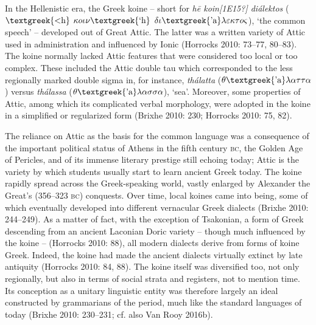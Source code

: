 \documentclass[12pt]{article}
\newenvironment{styleStandard}{\renewcommand\baselinestretch{1.25}\setlength\leftskip{0in}\setlength\rightskip{0in}\setlength\parindent{0.1972in}\setlength\parfillskip{0pt plus 1fil}\setlength\parskip{0in plus 1pt}\writerlistparindent\writerlistleftskip\leavevmode\normalfont\normalsize\writerlistlabel\ignorespaces}{\unskip\vspace{0in plus 1pt}\par}
\newcommand\writerlistleftskip{}
\newcommand\writerlistparindent{}
\newcommand\writerlistlabel{}
\begin{document}
\begin{styleStandard}
In the Hellenistic era, the Greek koine – short for \textit{h\=e koin[1E15?] diálektos} ($\text{\textgreek{<h}}$ $\kappa o\iota \nu \text{\textgreek{`h}}$ $\delta \iota \text{\textgreek{'a}}\lambda \varepsilon \kappa \tau o\varsigma $), ‘the common speech’ – developed out of Great Attic. The latter was a written variety of Attic used in administration and influenced by Ionic (Horrocks 2010: 73–77, 80–83). The koine normally lacked Attic features that were considered too local or too complex. These included the Attic double tau which corresponded to the less regionally marked double sigma in, for instance, \textit{thálatta }($\theta \text{\textgreek{'a}}\lambda \alpha \tau \tau \alpha $) versus \textit{thálassa }($\theta \text{\textgreek{'a}}\lambda \alpha \sigma \sigma \alpha $), ‘sea’. Moreover, some properties of Attic, among which its complicated verbal morphology, were adopted in the koine in a simplified or regularized form (Brixhe 2010: 230; Horrocks 2010: 75, 82).
\end{styleStandard}

\begin{styleStandard}
The reliance on Attic as the basis for the common language was a consequence of the important political status of Athens in the fifth century \textsc{bc}, the Golden Age of Pericles, and of its immense literary prestige still echoing today; Attic is the variety by which students usually start to learn ancient Greek today. The koine rapidly spread across the Greek-speaking world, vastly enlarged by Alexander the Great’s (356–323 \textsc{bc}) conquests. Over time, local koines came into being, some of which eventually developed into different vernacular Greek dialects (Brixhe 2010: 244–249). As a matter of fact, with the exception of Tsakonian, a form of Greek descending from an ancient Laconian Doric variety – though much influenced by the koine – (Horrocks 2010: 88), all modern dialects derive from forms of koine Greek. Indeed, the koine had made the ancient dialects virtually extinct by late antiquity (Horrocks 2010: 84, 88). The koine itself was diversified too, not only regionally, but also in terms of social strata and registers, not to mention time. Its conception as a unitary linguistic entity was therefore largely an ideal constructed by grammarians of the period, much like the standard languages of today (Brixhe 2010: 230–231; cf. also Van Rooy 2016b).
\end{styleStandard}
\end{document}
